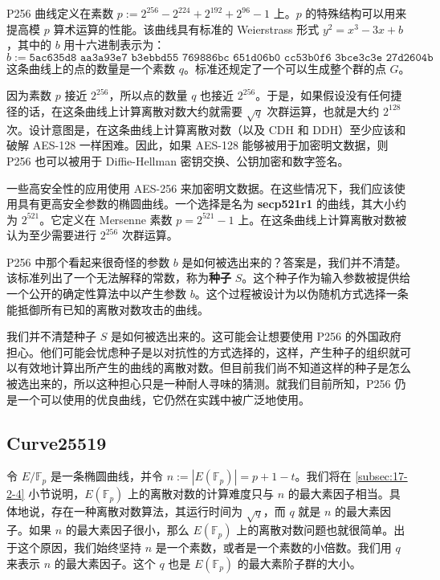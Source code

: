 P256 曲线定义在素数 $p:=2^{256}-2^{224}+2^{192}+2^{96}-1$ 上。$p$ 的特殊结构可以用来提高模 $p$ 算术运算的性能。该曲线具有标准的 Weierstrass 形式 $y^2=x^3-3x+b$，其中的 $b$ 用十六进制表示为：
\[
b:=\texttt{5ac635d8 aa3a93e7 b3ebbd55 769886bc 651d06b0 cc53b0f6 3bce3c3e 27d2604b}
\]
这条曲线上的点的数量是一个素数 $q$。标准还规定了一个可以生成整个群的点 $G$。

因为素数 $p$ 接近 $2^{256}$，所以点的数量 $q$ 也接近 $2^{256}$。于是，如果假设没有任何捷径的话，在这条曲线上计算离散对数大约就需要 $\sqrt{q}$ 次群运算，也就是大约 $2^{128}$ 次。设计意图是，在这条曲线上计算离散对数（以及 CDH 和 DDH）至少应该和破解 AES-128 一样困难。因此，如果 AES-128 能够被用于加密明文数据，则 P256 也可以被用于 Diffie-Hellman 密钥交换、公钥加密和数字签名。

一些高安全性的应用使用 AES-256 来加密明文数据。在这些情况下，我们应该使用具有更高安全参数的椭圆曲线。一个选择是名为 \textbf{secp521r1} 的曲线，其大小约为 $2^{521}$。它定义在 Mersenne 素数 $p=2^{521}-1$ 上。在这条曲线上计算离散对数被认为至少需要进行 $2^{256}$ 次群运算。

\begin{snote}[参数的选择。]
P256 中那个看起来很奇怪的参数 $b$ 是如何被选出来的？答案是，我们并不清楚。该标准列出了一个无法解释的常数，称为\textbf{种子} $S$。这个种子作为输入参数被提供给一个公开的确定性算法中以产生参数 $b$。这个过程被设计为以伪随机方式选择一条能抵御所有已知的离散对数攻击的曲线。

我们并不清楚种子 $S$ 是如何被选出来的。这可能会让想要使用 P256 的外国政府担心。他们可能会忧虑种子是以对抗性的方式选择的，这样，产生种子的组织就可以有效地计算出所产生的曲线的离散对数。但目前我们尚不知道这样的种子是怎么被选出来的，所以这种担心只是一种耐人寻味的猜测。就我们目前所知，P256 仍是一个可以使用的优良曲线，它仍然在实践中被广泛地使用。
\end{snote}

\subsection{Curve25519}

令 $E/\mathbb{F}_p$ 是一条椭圆曲线，并令 $n:=|E(\mathbb{F}_{p})|=p+1-t$。我们将在 \ref{subsec:17-2-4} 小节说明，$E(\mathbb{F}_{p})$ 上的离散对数的计算难度只与 $n$ 的最大素因子相当。具体地说，存在一种离散对数算法，其运行时间为 $\sqrt{q}$，而 $q$ 就是 $n$ 的最大素因子。如果 $n$ 的最大素因子很小，那么 $E(\mathbb{F}_{p})$ 上的离散对数问题也就很简单。出于这个原因，我们始终坚持 $n$ 是一个素数，或者是一个素数的小倍数。我们用 $q$ 来表示 $n$ 的最大素因子。这个 $q$ 也是 $E(\mathbb{F}_{p})$ 的最大素阶子群的大小。

